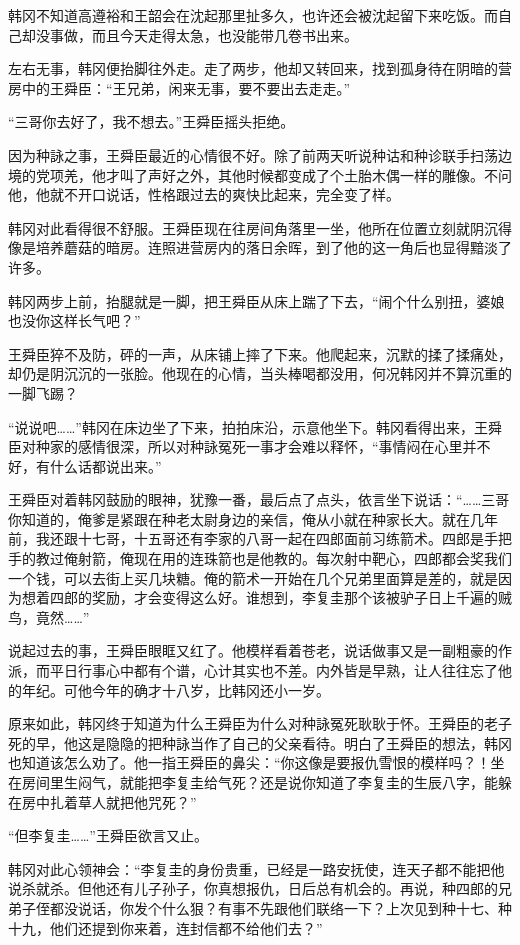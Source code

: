 韩冈不知道高遵裕和王韶会在沈起那里扯多久，也许还会被沈起留下来吃饭。而自己却没事做，而且今天走得太急，也没能带几卷书出来。

左右无事，韩冈便抬脚往外走。走了两步，他却又转回来，找到孤身待在阴暗的营房中的王舜臣：“王兄弟，闲来无事，要不要出去走走。”

“三哥你去好了，我不想去。”王舜臣摇头拒绝。

因为种詠之事，王舜臣最近的心情很不好。除了前两天听说种诂和种诊联手扫荡边境的党项羌，他才叫了声好之外，其他时候都变成了个土胎木偶一样的雕像。不问他，他就不开口说话，性格跟过去的爽快比起来，完全变了样。

韩冈对此看得很不舒服。王舜臣现在往房间角落里一坐，他所在位置立刻就阴沉得像是培养蘑菇的暗房。连照进营房内的落日余晖，到了他的这一角后也显得黯淡了许多。

韩冈两步上前，抬腿就是一脚，把王舜臣从床上踹了下去，“闹个什么别扭，婆娘也没你这样长气吧？”

王舜臣猝不及防，砰的一声，从床铺上摔了下来。他爬起来，沉默的揉了揉痛处，却仍是阴沉沉的一张脸。他现在的心情，当头棒喝都没用，何况韩冈并不算沉重的一脚飞踢？

“说说吧……”韩冈在床边坐了下来，拍拍床沿，示意他坐下。韩冈看得出来，王舜臣对种家的感情很深，所以对种詠冤死一事才会难以释怀，“事情闷在心里并不好，有什么话都说出来。”

王舜臣对着韩冈鼓励的眼神，犹豫一番，最后点了点头，依言坐下说话：“……三哥你知道的，俺爹是紧跟在种老太尉身边的亲信，俺从小就在种家长大。就在几年前，我还跟十七哥，十五哥还有李家的八哥一起在四郎面前习练箭术。四郎是手把手的教过俺射箭，俺现在用的连珠箭也是他教的。每次射中靶心，四郎都会奖我们一个钱，可以去街上买几块糖。俺的箭术一开始在几个兄弟里面算是差的，就是因为想着四郎的奖励，才会变得这么好。谁想到，李复圭那个该被驴子日上千遍的贼鸟，竟然……”

说起过去的事，王舜臣眼眶又红了。他模样看着苍老，说话做事又是一副粗豪的作派，而平日行事心中都有个谱，心计其实也不差。内外皆是早熟，让人往往忘了他的年纪。可他今年的确才十八岁，比韩冈还小一岁。

原来如此，韩冈终于知道为什么王舜臣为什么对种詠冤死耿耿于怀。王舜臣的老子死的早，他这是隐隐的把种詠当作了自己的父亲看待。明白了王舜臣的想法，韩冈也知道该怎么劝了。他一指王舜臣的鼻尖：“你这像是要报仇雪恨的模样吗？！坐在房间里生闷气，就能把李复圭给气死？还是说你知道了李复圭的生辰八字，能躲在房中扎着草人就把他咒死？”

“但李复圭……”王舜臣欲言又止。

韩冈对此心领神会：“李复圭的身份贵重，已经是一路安抚使，连天子都不能把他说杀就杀。但他还有儿子孙子，你真想报仇，日后总有机会的。再说，种四郎的兄弟子侄都没说话，你发个什么狠？有事不先跟他们联络一下？上次见到种十七、种十九，他们还提到你来着，连封信都不给他们去？”

